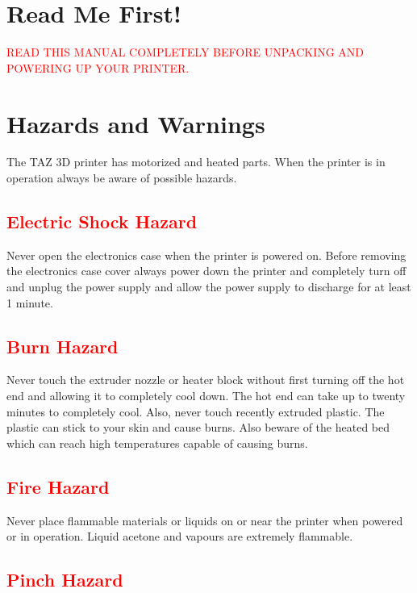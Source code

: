 \section{Read Me First!}
\textcolor{red}{READ THIS MANUAL COMPLETELY BEFORE UNPACKING AND POWERING UP YOUR PRINTER.}

\section{Hazards and Warnings}

The TAZ 3D printer has motorized and heated parts. When the printer is in operation always be aware of possible hazards.

\subsection{\textcolor{red}{Electric Shock Hazard}}
Never open the electronics case when the printer is powered on. Before removing the electronics case cover always power down the printer and completely turn off and unplug the power supply and allow the power supply to discharge for at least 1 minute.

\subsection{\textcolor{red}{Burn Hazard}}
Never touch the extruder nozzle or heater block without first turning off the hot end and allowing it to completely cool down. The hot end can take up to twenty minutes to completely cool. Also, never touch recently extruded plastic. The plastic can stick to your skin and  cause burns. Also beware of the heated bed which can reach high temperatures capable of causing burns.

\subsection{\textcolor{red}{Fire Hazard}}
Never place flammable materials or liquids on or near the printer when powered or in operation. Liquid acetone and vapours are extremely flammable.

\subsection{\textcolor{red}{Pinch Hazard}}

